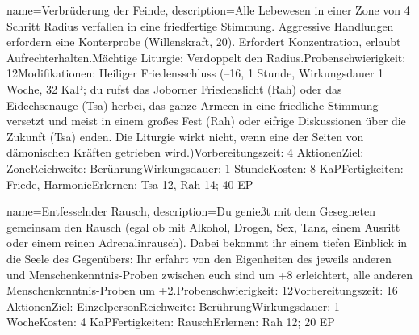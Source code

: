 {
    name={Verbrüderung der Feinde},
    description={Alle Lebewesen in einer Zone von 4 Schritt Radius verfallen in eine friedfertige Stimmung. Aggressive Handlungen erfordern eine Konterprobe (Willenskraft, 20). Erfordert Konzentration, erlaubt Aufrechterhalten.\newline Mächtige Liturgie: Verdoppelt den Radius.\newline Probenschwierigkeit: 12\newline Modifikationen: Heiliger Friedensschluss (–16, 1 Stunde, Wirkungsdauer 1 Woche, 32 KaP; du rufst das Joborner Friedenslicht (Rah) oder das Eidechsenauge (Tsa) herbei, das ganze Armeen in eine friedliche Stimmung versetzt und meist in einem großes Fest (Rah) oder eifrige Diskussionen über die Zukunft (Tsa) enden. Die Liturgie wirkt nicht, wenn eine der Seiten von dämonischen Kräften getrieben wird.)\newline Vorbereitungszeit: 4 Aktionen\newline Ziel: Zone\newline Reichweite: Berührung\newline Wirkungsdauer: 1 Stunde\newline Kosten: 8 KaP\newline Fertigkeiten: Friede, Harmonie\newline Erlernen: Tsa 12, Rah 14; 40 EP}
}


{
    name={Entfesselnder Rausch},
    description={Du genießt mit dem Gesegneten gemeinsam den Rausch (egal ob mit Alkohol, Drogen, Sex, Tanz, einem Ausritt oder einem reinen Adrenalinrausch). Dabei bekommt ihr einem tiefen Einblick in die Seele des Gegenübers: Ihr erfahrt von den Eigenheiten des jeweils anderen und Menschenkenntnis-Proben zwischen euch sind um +8 erleichtert, alle anderen Menschenkenntnis-Proben um +2.\newline Probenschwierigkeit: 12\newline Vorbereitungszeit: 16 Aktionen\newline Ziel: Einzelperson\newline Reichweite: Berührung\newline Wirkungsdauer: 1 Woche\newline Kosten: 4 KaP\newline Fertigkeiten: Rausch\newline Erlernen: Rah 12; 20 EP}
}


